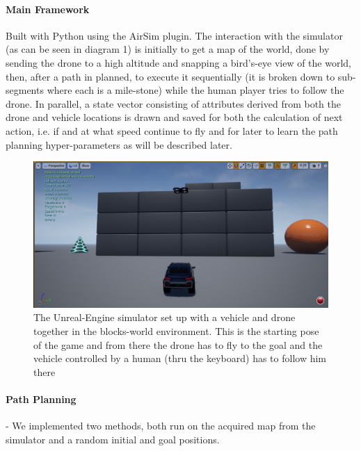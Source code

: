 \documentclass[a4paper,11pt]{article}
\begin{document}
\paragraph{Main Framework} Built  with Python using the AirSim plugin. The interaction with the simulator (as can be seen in diagram 1) is initially to get a map of the world, done by sending the drone to a high altitude and snapping a bird's-eye view of the world, then, after a path in planned, to execute it sequentially (it is broken down to sub-segments where each is a mile-stone) while the human player tries to follow the drone. In parallel, a state vector consisting of attributes derived from both the drone and vehicle locations is drawn and saved for both the calculation of next action, i.e. if and at what speed continue to fly and for later to learn the path planning hyper-parameters as will be described later. 

\begin{figure}[!h]
    \centering
    \includegraphics[width=.8\textwidth]{drone_car_2.png}
    \caption{The Unreal-Engine simulator set up with a vehicle and drone together in the blocks-world environment. This is the starting pose of the game and from there the drone has to fly to the goal and the vehicle controlled by a human (thru the keyboard) has to follow him there}
    \label{fig:simulator}
\end{figure}

\paragraph{Path Planning} - We implemented two methods, both run on the acquired map from the simulator and a random initial and goal positions.
\end{document}
